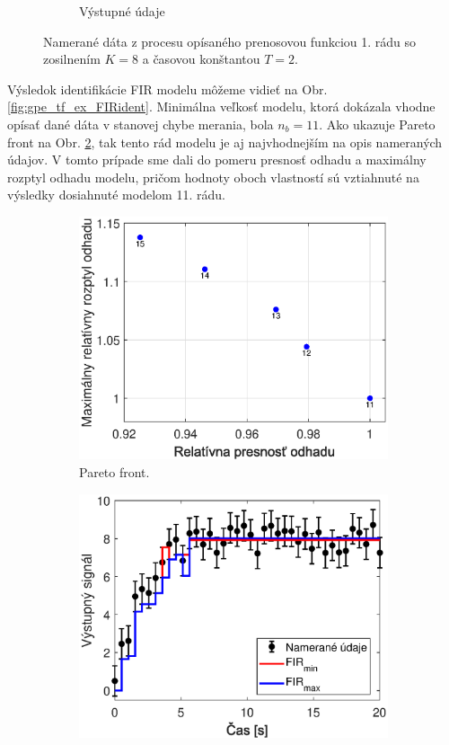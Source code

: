 \begin{figure}
\begin{subfigure}[b]{0.48\textwidth}
		\caption{Výstupné údaje}
	\end{subfigure}
	\caption{Namerané dáta z procesu opísaného prenosovou funkciou 1. rádu so zosilnením $ K = 8 $ a časovou konštantou $ T = 2 $.}
	\label{fig:gpe_tf_ex_data}
\end{figure}

Výsledok identifikácie FIR modelu môžeme vidieť na Obr. \ref{fig:gpe_tf_ex_FIRident}. Minimálna veľkosť modelu, ktorá dokázala vhodne opísať dané dáta v stanovej chybe merania, bola $ n_b = 11 $. Ako ukazuje Pareto front na Obr. \ref{fig:gpe_tf_ex_FIRpareto}, tak tento rád modelu je aj najvhodnejším na opis nameraných údajov. V tomto prípade sme dali do pomeru presnosť odhadu a maximálny rozptyl odhadu modelu, pričom hodnoty oboch vlastností sú vztiahnuté na výsledky dosiahnuté modelom 11. rádu.
\begin{figure}
	\centering
	\begin{subfigure}[b]{0.48\textwidth}
		\centering
		\includegraphics[width=\linewidth]{images/gpe_tf_ex_FIRpareto}
		\caption{Pareto front.}
		\label{fig:gpe_tf_ex_FIRpareto}
	\end{subfigure}
	\begin{subfigure}[b]{0.48\textwidth}
		\centering
		\includegraphics[width=\linewidth]{images/gpe_tf_ex_FIRident}

\end{subfigure}
\end{figure}

